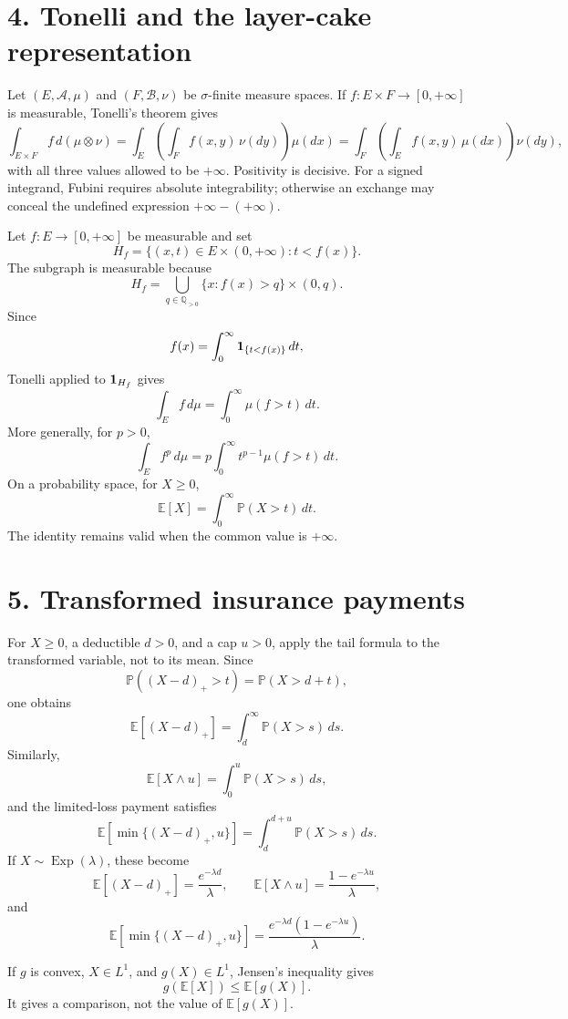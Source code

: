 \section*{4. Tonelli and the layer-cake representation}

Let $(E,\mathcal A,\mu)$ and $(F,\mathcal B,\nu)$ be $\sigma$-finite measure spaces. If $f:E\times F\to[0,+\infty]$ is measurable, Tonelli's theorem gives
\[
\int_{E\times F}f\,d(\mu\otimes\nu)
=
\int_E\!\left(\int_Ff(x,y)\,\nu(dy)\right)\mu(dx)
=
\int_F\!\left(\int_Ef(x,y)\,\mu(dx)\right)\nu(dy),
\]
with all three values allowed to be $+\infty$. Positivity is decisive. For a signed integrand, Fubini requires absolute integrability; otherwise an exchange may conceal the undefined expression $+\infty-(+\infty)$.

Let $f:E\to[0,+\infty]$ be measurable and set
\[
H_f=\{(x,t)\in E\times(0,+\infty):t<f(x)\}.
\]
The subgraph is measurable because
\[
H_f
=
\bigcup_{q\in\mathbb Q_{>0}}
\{x:f(x)>q\}\times(0,q).
\]
Since
\[
f(x)=\int_0^\infty\mathbf 1_{\{t<f(x)\}}\,dt,
\]
Tonelli applied to $\mathbf 1_{H_f}$ gives
\[
\boxed{
\int_Ef\,d\mu
=
\int_0^\infty\mu(f>t)\,dt
}.
\]
More generally, for $p>0$,
\[
\int_Ef^p\,d\mu
=
p\int_0^\infty t^{p-1}\mu(f>t)\,dt.
\]
On a probability space, for $X\ge0$,
\[
\boxed{
\mathbb E[X]
=
\int_0^\infty\mathbb P(X>t)\,dt
}.
\]
The identity remains valid when the common value is $+\infty$.

\section*{5. Transformed insurance payments}

For $X\ge0$, a deductible $d>0$, and a cap $u>0$, apply the tail formula to the transformed variable, not to its mean. Since
\[
\mathbb P((X-d)_+>t)=\mathbb P(X>d+t),
\]
one obtains
\[
\boxed{
\mathbb E[(X-d)_+]
=
\int_d^\infty\mathbb P(X>s)\,ds
}.
\]
Similarly,
\[
\boxed{
\mathbb E[X\wedge u]
=
\int_0^u\mathbb P(X>s)\,ds
},
\]
and the limited-loss payment satisfies
\[
\boxed{
\mathbb E[\min\{(X-d)_+,u\}]
=
\int_d^{d+u}\mathbb P(X>s)\,ds
}.
\]
If $X\sim\operatorname{Exp}(\lambda)$, these become
\[
\mathbb E[(X-d)_+]
=
\frac{e^{-\lambda d}}{\lambda},
\qquad
\mathbb E[X\wedge u]
=
\frac{1-e^{-\lambda u}}{\lambda},
\]
and
\[
\mathbb E[\min\{(X-d)_+,u\}]
=
\frac{e^{-\lambda d}(1-e^{-\lambda u})}{\lambda}.
\]

If $g$ is convex, $X\in L^1$, and $g(X)\in L^1$, Jensen's inequality gives
\[
g(\mathbb E[X])\le\mathbb E[g(X)].
\]
It gives a comparison, not the value of $\mathbb E[g(X)]$.

